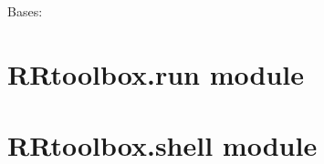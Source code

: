 \documentclass[letterpaper,10pt,english]{sphinxmanual}
\begin{document}
\begin{fulllineitems}
\label{RRtoolbox:RRtoolbox.core.f}
\end{fulllineitems}


\begin{fulllineitems}
\label{RRtoolbox:RRtoolbox.core.rrbox}
Bases: 

\begin{fulllineitems}
\label{RRtoolbox:RRtoolbox.core.rrbox.asift}
\end{fulllineitems}


\end{fulllineitems}


\begin{fulllineitems}
\label{RRtoolbox:RRtoolbox.core.tools}
\end{fulllineitems}


\begin{fulllineitems}
\label{RRtoolbox:RRtoolbox.core.tools2}
\end{fulllineitems}



\section{RRtoolbox.run module}
\label{RRtoolbox:module-RRtoolbox.run}\label{RRtoolbox:rrtoolbox-run-module}

\section{RRtoolbox.shell module}
\label{RRtoolbox:module-RRtoolbox.shell}\label{RRtoolbox:rrtoolbox-shell-module}
\end{document}
